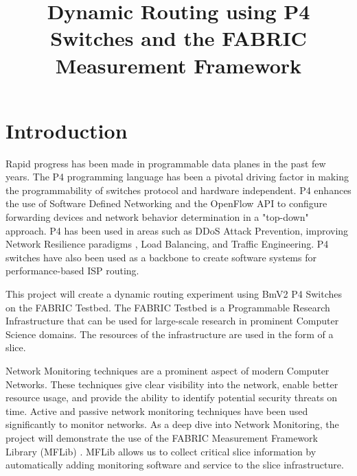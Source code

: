 \documentclass[conference]{IEEEtran}
\begin{document}
\title{Dynamic Routing using P4 Switches and the FABRIC Measurement Framework\\}

\author{
\and
{}
}
\maketitle

\section{Introduction}
Rapid progress has been made in programmable data planes in the past few years. The P4 programming language \cite{b1} has been a pivotal driving factor in making the programmability of switches protocol and hardware independent. P4 enhances the use of Software Defined Networking and the OpenFlow API to configure forwarding devices and network behavior determination in a "top-down" approach. P4 has been used in areas such as DDoS Attack Prevention, improving Network Resilience paradigms \cite{b2}, Load Balancing, and Traffic Engineering. P4 switches have also been used as a backbone to create software systems for performance-based ISP routing.

This project will create a dynamic routing experiment using BmV2 P4 Switches on the FABRIC Testbed. The FABRIC Testbed is a Programmable Research Infrastructure that can be used for large-scale research in prominent Computer Science domains. The resources of the infrastructure are used in the form of a slice. 

Network Monitoring techniques are a prominent aspect of modern Computer Networks. These techniques give clear visibility into the network, enable better resource usage, and provide the ability to identify potential security threats on time. Active and passive network monitoring techniques have been used significantly to monitor networks. As a deep dive into Network Monitoring, the project will demonstrate the use of the FABRIC Measurement Framework Library (MFLib) \cite{b3}. MFLib allows us to collect critical slice information by automatically adding monitoring software and service to the slice infrastructure. 
\end{document}
